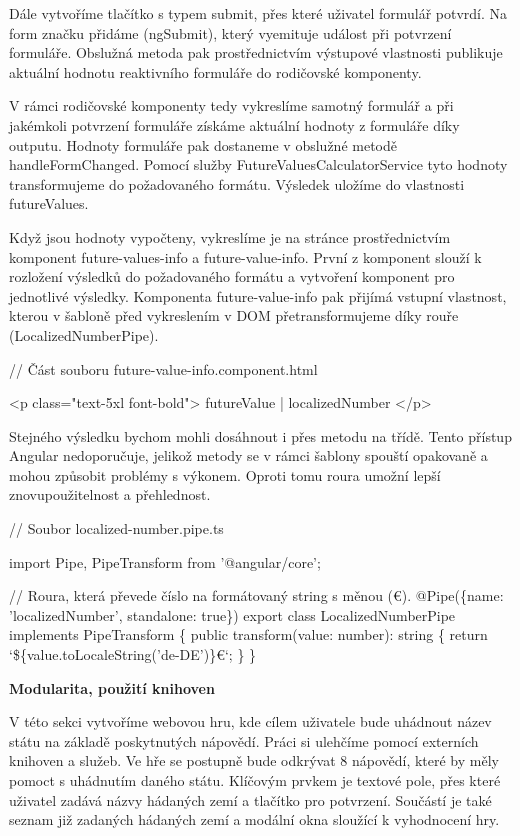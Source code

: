 Dále vytvoříme tlačítko s typem submit, přes které uživatel formulář potvrdí. Na form značku přidáme (ngSubmit), který vyemituje událost při potvrzení formuláře. 
Obslužná metoda pak prostřednictvím výstupové vlastnosti publikuje aktuální hodnotu reaktivního formuláře do rodičovské komponenty.

V rámci rodičovské komponenty tedy vykreslíme samotný formulář a při jakémkoli potvrzení formuláře získáme aktuální hodnoty z formuláře díky outputu. 
Hodnoty formuláře pak dostaneme v obslužné metodě handleFormChanged. Pomocí služby FutureValuesCalculatorService tyto hodnoty transformujeme do požadovaného formátu. 
Výsledek uložíme do vlastnosti futureValues. 

Když jsou hodnoty vypočteny, vykreslíme je na stránce prostřednictvím komponent future-values-info a future-value-info. 
První z komponent slouží k rozložení výsledků do požadovaného formátu a vytvoření komponent pro jednotlivé výsledky. 
Komponenta future-value-info pak přijímá vstupní vlastnost, kterou v šabloně před vykreslením v DOM přetransformujeme díky rouře (LocalizedNumberPipe).

\begin{prog}
// Část souboru future-value-info.component.html

<p class="text-5xl font-bold">{{ futureValue | localizedNumber }}</p>
\end{prog}

Stejného výsledku bychom mohli dosáhnout i přes metodu na třídě. Tento přístup Angular nedoporučuje, jelikož metody se v rámci šablony spouští opakovaně a mohou způsobit problémy s výkonem. 
Oproti tomu roura umožní lepší znovupoužitelnost a přehlednost.

\begin{prog}
// Soubor localized-number.pipe.ts

import {Pipe, PipeTransform} from '@angular/core';

// Roura, která převede číslo na formátovaný string s měnou (€).
@Pipe(\{name: 'localizedNumber', standalone: true\})
export class LocalizedNumberPipe implements PipeTransform \{
  public transform(value: number): string \{
    return `\$\{value.toLocaleString('de-DE')\}€`;
  \}
\}
\end{prog}

\begin{flushleft}
  \textbf{Modularita, použití knihoven}
\end{flushleft}

V této sekci vytvoříme webovou hru, kde cílem uživatele bude uhádnout název státu na základě poskytnutých nápovědí. Práci si ulehčíme pomocí externích knihoven a služeb.
Ve hře se postupně bude odkrývat 8 nápovědí, které by měly pomoct s uhádnutím daného státu. 
Klíčovým prvkem je textové pole, přes které uživatel zadává názvy hádaných zemí a tlačítko pro potvrzení. 
Součástí je také seznam již zadaných hádaných zemí a modální okna sloužící k vyhodnocení hry.

